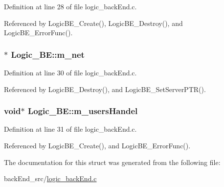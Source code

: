 Definition at line 28 of file logic\+\_\+back\+End.\+c.



Referenced by Logic\+B\+E\+\_\+\+Create(), Logic\+B\+E\+\_\+\+Destroy(), and Logic\+B\+E\+\_\+\+Error\+Func().

\subsubsection[{\texorpdfstring{m\+\_\+net}{m_net}}]{$\ast$ Logic\+\_\+\+B\+E\+::m\+\_\+net}\hypertarget{structLogic__BE_a3c05a016e4fea8ee6584b26afffe11c7}{}\label{structLogic__BE_a3c05a016e4fea8ee6584b26afffe11c7}


Definition at line 30 of file logic\+\_\+back\+End.\+c.



Referenced by Logic\+B\+E\+\_\+\+Destroy(), and Logic\+B\+E\+\_\+\+Set\+Server\+P\+T\+R().

\subsubsection[{\texorpdfstring{m\+\_\+users\+Handel}{m_usersHandel}}]{\setlength{\rightskip}{0pt plus 5cm}void$\ast$ Logic\+\_\+\+B\+E\+::m\+\_\+users\+Handel}\hypertarget{structLogic__BE_af7dbb1a314b55075e00b79eb36b3d39e}{}\label{structLogic__BE_af7dbb1a314b55075e00b79eb36b3d39e}


Definition at line 31 of file logic\+\_\+back\+End.\+c.



Referenced by Logic\+B\+E\+\_\+\+Create(), and Logic\+B\+E\+\_\+\+Error\+Func().



The documentation for this struct was generated from the following file\+:\begin{DoxyCompactItemize}
\item 
back\+End\+\_\+src/\hyperlink{logic__backEnd_8c}{logic\+\_\+back\+End.\+c}\end{DoxyCompactItemize}
